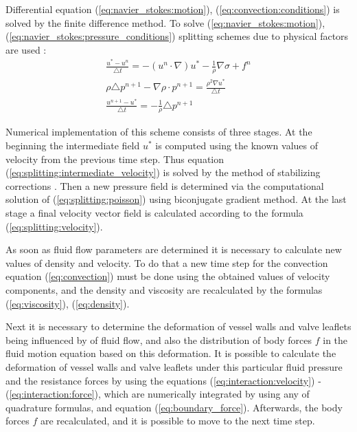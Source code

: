 \documentclass[conference]{IEEEtran}
\begin{document}
Differential equation (\ref{eq:navier_stokes:motion}), (\ref{eq:convection:conditions}) is solved by the finite difference method.
To solve (\ref{eq:navier_stokes:motion}), (\ref{eq:navier_stokes:pressure_conditions}) splitting schemes due to physical factors are used \cite{belotserkovsky}:
\begin{gather}
    \label{eq:splitting:intermediate_velocity}
    \frac{u^* - u^n}{\triangle t} = - (u^n \cdot \nabla) u^* - \frac{1}{\rho} \nabla \sigma + f^n\\
    \label{eq:splitting:poisson}
    \rho \triangle p^{n+1} - \nabla \rho \cdot p^{n+1} = \frac{\rho^2 \nabla u^*}{\triangle t}\\
    \label{eq:splitting:velocity}
    \frac{u^{n+1} - u^*}{\triangle t} = - \frac{1}{\rho} \triangle p^{n+1}
\end{gather}

Numerical implementation of this scheme consists of three stages. At the beginning the intermediate field $u^*$  is computed using the known values of velocity
from the previous time step. Thus equation (\ref{eq:splitting:intermediate_velocity}) is solved by the method of stabilizing corrections \cite{yanenko}.
Then a new pressure field is determined via the computational solution of (\ref{eq:splitting:poisson}) using biconjugate gradient method.
At the last stage a final velocity vector field is calculated according to the formula (\ref{eq:splitting:velocity}).

As soon as fluid flow parameters are determined it is necessary to calculate new values of density and velocity. To do that a new time step for the convection
equation (\ref{eq:convection}) must be done using the obtained values of velocity components, and the density and viscosity are recalculated
by the formulas (\ref{eq:viscosity}), (\ref{eq:density}).

Next it is necessary to determine the deformation of vessel walls and valve leaflets being influenced by of fluid flow, and also the distribution of body forces $f$
in the fluid motion equation based on this deformation. It is possible to calculate the deformation of vessel walls and valve leaflets under this particular fluid pressure
and the resistance forces by using the equations (\ref{eq:interaction:velocity}) - (\ref{eq:interaction:force}), which are numerically integrated by
using any of quadrature formulas, and equation (\ref{eq:boundary_force}). Afterwards, the body forces $f$
are recalculated, and it is possible to move to the next time step.
\end{document}
